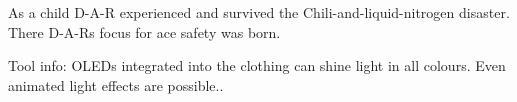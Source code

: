 \begin{npcBox}[title=Pioneer: Drop-and-run]
    \begin{stressSection}
    \end{stressSection}
    \begin{tabularx}{\textwidth}{ XX }
    \end{tabularx}

    \begin{consequences}
    \item {}
    \item {}
    \item {}
    \end{consequences}

    \begin{npcDescription}

    As a child D-A-R experienced and survived the Chili-and-liquid-nitrogen disaster. There D-A-Rs focus for ace safety was born.

    Tool info: OLEDs integrated into the clothing can shine light in all colours. Even animated light effects are possible..

    \end{npcDescription}

\end{npcBox}




